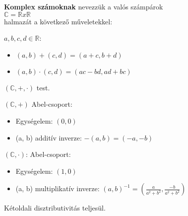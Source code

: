 \begin{frame}
\begin{tcolorbox}[title={Def.: Komplex számok}]
  \textbf{Komplex számoknak} nevezzük a valós számpárok\\
  $\mathbb{C} = \mathbb{R} x \mathbb{R}$\\
  halmazát a következő műveletekkel:\\
  \msmallskip

  $a, b, c, d \in \mathbb{R}$:\\
  \begin{itemize}
    \item $(a, b) + (c, d) = (a + c, b + d)$\\
    \item $(a, b) \cdot (c, d) = (ac - bd, ad + bc)$
  \end{itemize}
\end{tcolorbox}

\begin{tcolorbox}[title={Ész}]
  $(\mathbb{C}, +, {\cdot})$ test.\\
  \mmedskip

  $(\mathbb{C}, +)$ Abel-csoport:\\
  \begin{itemize}
    \item Egységelem: $(0, 0)$
    \item (a, b) additív inverze: $-(a, b) = (-a, -b)$
  \end{itemize}
  \mmedskip

  $(\mathbb{C}, {\cdot})$: Abel-csoport:\\
  \begin{itemize}
    \item Egységelem: $(1, 0)$
    \item (a, b) multiplikatív inverze: $(a, b)^{-1} = (\frac{a}{a^2 + b^2}, \frac{-b}{a^2 + b^2})$
  \end{itemize}
  \mmedskip

  Kétoldali disztributivitás teljesül.
\end{tcolorbox}
\end{frame}

